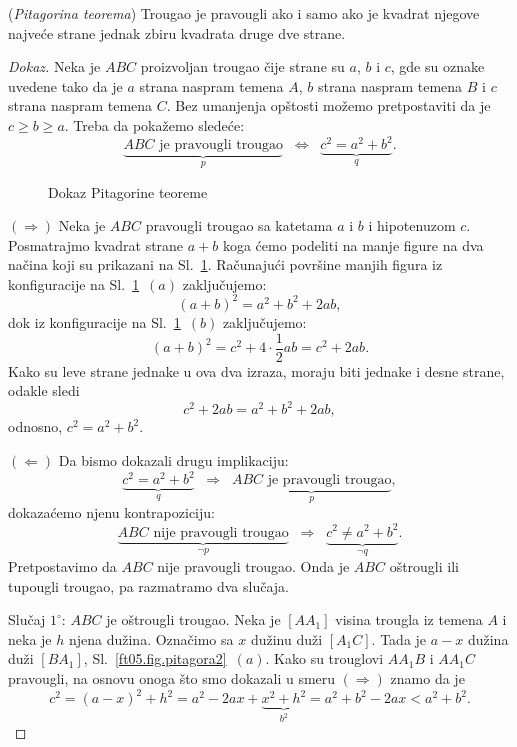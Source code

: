 \begin{EX} (\emph{Pitagorina teorema})
  Trougao je pravougli ako i samo ako je kvadrat njegove najve\'ce strane jednak zbiru kvadrata druge dve strane.
\end{EX}
\begin{proof}[Dokaz]
  Neka je $ABC$ proizvoljan trougao \v cije strane su $a$, $b$ i $c$, gde su oznake uvedene tako da je $a$ strana
  naspram temena $A$, $b$ strana naspram temena $B$ i $c$ strana
  naspram temena $C$. Bez umanjenja op\v stosti mo\v zemo pretpostaviti
  da je $c \ge b \ge a$. Treba da poka\v zemo slede\'ce:
  $$
    \underbrace{ABC \text{\ \ je pravougli trougao}}_p \;\;\Leftrightarrow\;\; \underbrace{c^2 = a^2 + b^2}_q.
  $$
  
\begin{figure}
  \centering
  
  \caption{Dokaz Pitagorine teoreme}
  \label{ft05.fig.pitagora}
\end{figure}

  $(\Rightarrow)$ Neka je $ABC$ pravougli trougao sa katetama $a$ i $b$ i hipotenuzom $c$.
  Posmatrajmo kvadrat strane $a + b$ koga \'cemo podeliti na manje figure na dva na\v cina koji su prikazani na
  Sl.~\ref{ft05.fig.pitagora}. Ra\v cunaju\'ci povr\v sine manjih figura iz konfiguracije na Sl.~\ref{ft05.fig.pitagora}~$(a)$
  zaklju\v cujemo:
  $$
    (a + b)^2 = a^2 + b^2 + 2ab,
  $$
  dok iz konfiguracije na Sl.~\ref{ft05.fig.pitagora}~$(b)$ zaklju\v cujemo:
  $$
    (a + b)^2 = c^2 + 4 \cdot \frac 12 ab = c^2 + 2ab.
  $$
  Kako su leve strane jednake u ova dva izraza, moraju biti jednake i desne strane, odakle sledi
  $$
    c^2 + 2ab = a^2 + b^2 + 2ab,
  $$
  odnosno, $c^2 = a^2 + b^2$.
  
  $(\Leftarrow)$
  Da bismo dokazali drugu implikaciju:
  $$
    \underbrace{c^2 = a^2 + b^2}_q \;\;\Rightarrow\;\; \underbrace{ABC \text{\ \ je pravougli trougao}}_p,
  $$
  dokaza\'cemo njenu kontrapoziciju:
  $$
    \underbrace{ABC \text{\ \ nije pravougli trougao}}_{\lnot p} \;\;\Rightarrow\;\; \underbrace{c^2 \ne a^2 + b^2}_{\lnot q}.
  $$
  Pretpostavimo da $ABC$ nije pravougli trougao. Onda je $ABC$ o\v strougli ili tupougli trougao, pa razmatramo dva slu\v caja.
  
  \medskip
  
  Slu\v caj $1^\circ$: $ABC$ je o\v strougli trougao.
  Neka je $[AA_1]$ visina trougla iz temena $A$ i neka je $h$ njena du\v zina. Ozna\v cimo sa $x$ du\v zinu du\v zi $[A_1C]$.
  Tada je $a - x$ du\v zina du\v zi $[BA_1]$, Sl.~\ref{ft05.fig.pitagora2}~$(a)$. Kako su trouglovi $AA_1B$ i $AA_1C$ pravougli,
  na osnovu onoga \v sto smo dokazali u smeru $(\Rightarrow)$ znamo da je
  $$
    c^2 = (a - x)^2 + h^2 = a^2 - 2ax + \underbrace{x^2 + h^2}_{b^2} = a^2 + b^2 - 2ax < a^2 + b^2.
  $$


\end{proof}
